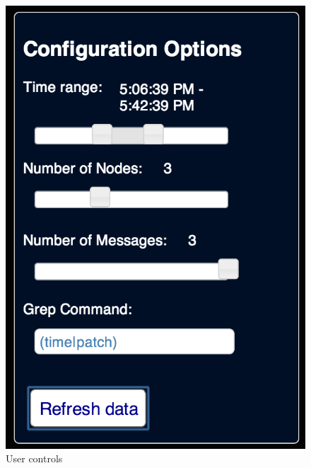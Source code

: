 \documentclass[conference]{style/acmsiggraph}
\begin{document}
\begin{figure}[p]
    \centering
    \includegraphics[width=0.7\columnwidth]{images/screenshot_controls.png}
    \caption{User controls}
    \label{fig:ss_controls}
\end{figure}
\end{document}

